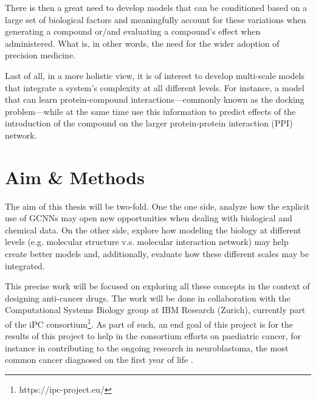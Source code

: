 \documentclass{article}
\begin{document}
There is then a great need to develop models that can be conditioned based on a large
 set of biological factors and meaningfully account for these variations when generating
 a compound or/and evaluating a compound's effect when administered. What is, in other
 words, the need for the wider adoption of precision medicine.

Last of all, in a more holistic view, it is of interest to develop multi-scale models
 that integrate a system's complexity at all different levels. For instance, a model
 that can learn protein-compound interactions---commonly known as the docking
 problem---while at the same time use this information to predict effects of the
 introduction of the compound on the larger protein-protein interaction (PPI)
 network\cite{Sun2019}.

    \section*{Aim \& Methods}

The aim of this thesis will be two-fold. One the one side, analyze how the explicit use
 of GCNNs may open new opportunities when dealing with biological and chemical data. On
 the other side, explore how modeling the biology at different levels (e.g. molecular
 structure v.s. molecular interaction network) may help create better models and,
 additionally, evaluate how these different scales may be integrated.

This precise work will be focused on exploring all these concepts in the context of
 designing anti-cancer drugs. The work will be done in collaboration with the
 Computational Systems Biology group at IBM Research (Zurich), currently part of the iPC
 consortium\footnote{https://ipc-project.eu/}. As part of such, an end goal of this
 project is for the results of this project to help in the consortium efforts on
 paediatric cancer, for instance in contributing to the ongoing research in
 neuroblastoma, the most common cancer diagnosed on the first year of life
 \cite{Maris2010}.
\end{document}
